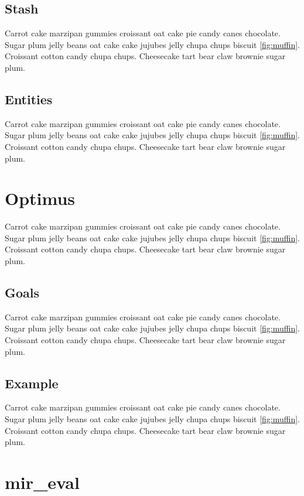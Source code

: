 \subsection{Stash}

Carrot cake marzipan gummies croissant oat cake pie candy canes chocolate.
Sugar plum jelly beans oat cake cake jujubes jelly chupa chups biscuit \ref{fig:muffin}.
Croissant cotton candy chupa chups.
Cheesecake tart bear claw brownie sugar plum.

\subsection{Entities}

Carrot cake marzipan gummies croissant oat cake pie candy canes chocolate.
Sugar plum jelly beans oat cake cake jujubes jelly chupa chups biscuit \ref{fig:muffin}.
Croissant cotton candy chupa chups.
Cheesecake tart bear claw brownie sugar plum.


\section{Optimus}
\label{sec:optimus}

Carrot cake marzipan gummies croissant oat cake pie candy canes chocolate.
Sugar plum jelly beans oat cake cake jujubes jelly chupa chups biscuit \ref{fig:muffin}.
Croissant cotton candy chupa chups.
Cheesecake tart bear claw brownie sugar plum.

\subsection{Goals}

Carrot cake marzipan gummies croissant oat cake pie candy canes chocolate.
Sugar plum jelly beans oat cake cake jujubes jelly chupa chups biscuit \ref{fig:muffin}.
Croissant cotton candy chupa chups.
Cheesecake tart bear claw brownie sugar plum.

\subsection{Example}

Carrot cake marzipan gummies croissant oat cake pie candy canes chocolate.
Sugar plum jelly beans oat cake cake jujubes jelly chupa chups biscuit \ref{fig:muffin}.
Croissant cotton candy chupa chups.
Cheesecake tart bear claw brownie sugar plum.


\section{mir\_eval}
\label{sec:mir_eval}

